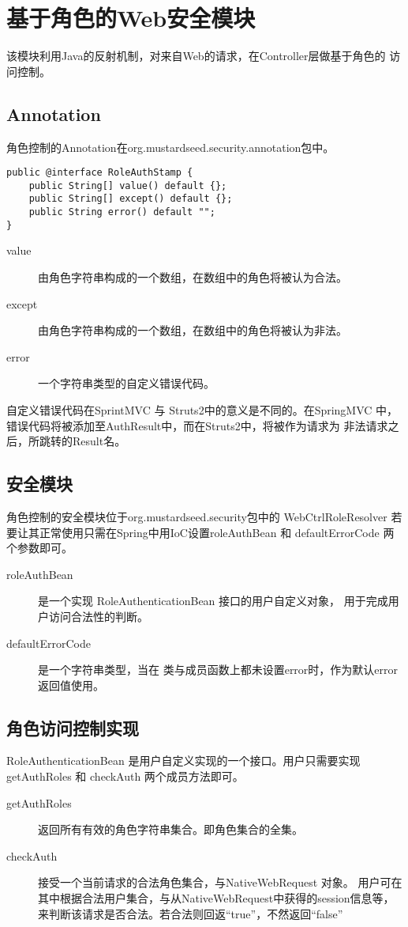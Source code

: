 \section{基于角色的Web安全模块}
该模块利用Java的反射机制，对来自Web的请求，在Controller层做基于角色的
访问控制。

\subsection{Annotation}
角色控制的Annotation在org.mustardseed.security.annotation包中。
\begin{verbatim}
public @interface RoleAuthStamp {
    public String[] value() default {};
    public String[] except() default {};
    public String error() default "";
}
\end{verbatim}

\begin{description}
\item[value] 由角色字符串构成的一个数组，在数组中的角色将被认为合法。
\item[except] 由角色字符串构成的一个数组，在数组中的角色将被认为非法。
\item[error] 一个字符串类型的自定义错误代码。
\end{description}

自定义错误代码在SprintMVC 与 Struts2中的意义是不同的。在SpringMVC
中，错误代码将被添加至AuthResult中，而在Struts2中，将被作为请求为
非法请求之后，所跳转的Result名。

\subsection{安全模块}
角色控制的安全模块位于org.mustardseed.security包中的 WebCtrlRoleResolver
若要让其正常使用只需在Spring中用IoC设置roleAuthBean 和 defaultErrorCode 
两个参数即可。
\begin{description}
\item[roleAuthBean]是一个实现 RoleAuthenticationBean 接口的用户自定义对象，
用于完成用户访问合法性的判断。
\item[defaultErrorCode]是一个字符串类型，当在
类与成员函数上都未设置error时，作为默认error返回值使用。
\end{description}

\subsection{角色访问控制实现}
RoleAuthenticationBean 是用户自定义实现的一个接口。用户只需要实现 getAuthRoles
 和 checkAuth 两个成员方法即可。
\begin{description}
\item[getAuthRoles] 返回所有有效的角色字符串集合。即角色集合的全集。
\item[checkAuth] 接受一个当前请求的合法角色集合，与NativeWebRequest 对象。
用户可在其中根据合法用户集合，与从NativeWebRequest中获得的session信息等，
来判断该请求是否合法。若合法则回返``true''，不然返回``false''
\end{description}


